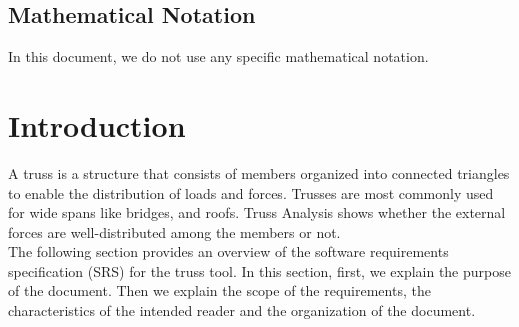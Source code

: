 \documentclass[12pt]{article}
\begin{document}
\subsection{Mathematical Notation}
In this document, we do not use any specific mathematical notation.

\newpage




\section{Introduction}
{A truss is a structure that consists of members organized into connected triangles to enable the distribution of loads and forces. Trusses are most commonly used for wide spans like bridges, and roofs. Truss Analysis shows whether the external forces are well-distributed among the members or not. \\
The following section provides an overview of the software requirements specification (SRS) for the truss tool. In this section, first, we explain the purpose of the document. Then we explain the scope of the requirements, the characteristics of the intended reader and the organization of the document.
}
\end{document}
